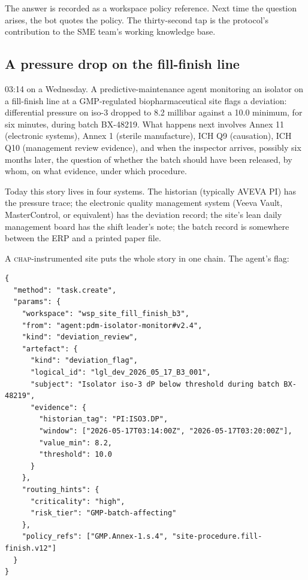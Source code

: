 \documentclass[11pt]{article}
\newcommand{\chap}{\textsc{chap}}
\begin{document}
The answer is recorded as a workspace policy reference. Next time the question arises, the bot quotes the policy. The thirty-second tap is the protocol's contribution to the SME team's working knowledge base.

\subsection{A pressure drop on the fill-finish line}

03:14 on a Wednesday. A predictive-maintenance agent monitoring an isolator on a fill-finish line at a GMP-regulated biopharmaceutical site flags a deviation: differential pressure on iso-3 dropped to 8.2 millibar against a 10.0 minimum, for six minutes, during batch BX-48219. What happens next involves Annex 11 (electronic systems), Annex 1 (sterile manufacture), ICH Q9 (causation), ICH Q10 (management review evidence), and when the inspector arrives, possibly six months later, the question of whether the batch should have been released, by whom, on what evidence, under which procedure.

Today this story lives in four systems. The historian (typically AVEVA PI) has the pressure trace; the electronic quality management system (Veeva Vault, MasterControl, or equivalent) has the deviation record; the site's lean daily management board has the shift leader's note; the batch record is somewhere between the ERP and a printed paper file.

A \chap{}-instrumented site puts the whole story in one chain. The agent's flag:

\begin{lstlisting}[caption={Predictive-maintenance agent deviation flag.},label={lst:case10-flag}]
{
  "method": "task.create",
  "params": {
    "workspace": "wsp_site_fill_finish_b3",
    "from": "agent:pdm-isolator-monitor#v2.4",
    "kind": "deviation_review",
    "artefact": {
      "kind": "deviation_flag",
      "logical_id": "lgl_dev_2026_05_17_B3_001",
      "subject": "Isolator iso-3 dP below threshold during batch BX-48219",
      "evidence": {
        "historian_tag": "PI:ISO3.DP",
        "window": ["2026-05-17T03:14:00Z", "2026-05-17T03:20:00Z"],
        "value_min": 8.2,
        "threshold": 10.0
      }
    },
    "routing_hints": {
      "criticality": "high",
      "risk_tier": "GMP-batch-affecting"
    },
    "policy_refs": ["GMP.Annex-1.s.4", "site-procedure.fill-finish.v12"]
  }
}
\end{lstlisting}
\end{document}
